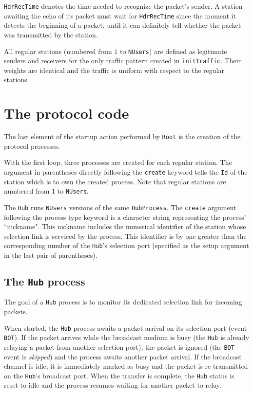 {\tt HdrRecTime} denotes the time needed to recognize the packet's sender.
A station awaiting the echo of its packet must wait for {\tt HdrRecTime}
since the moment it detects the beginning of a packet, until it can definitely
tell whether the packet was transmitted by the station.

All regular stations (numbered from $1$ to {\tt NUsers}) are defined as
legitimate senders and receivers for the only traffic pattern created in
{\tt initTraffic}.
Their weights are identical and the traffic is uniform with respect to the
regular stations.

\section{The protocol code}

The last element of the startup action performed by {\tt Root} is the creation
of the protocol processes.

With the first loop, three processes are created for each regular station.
The argument in parentheses directly following the {\tt create} keyword
tells the {\tt Id} of the station which is to own the created process.
Note that regular stations are numbered from $1$ to {\tt NUsers}.

The {\tt Hub} runs {\tt NUsers} versions of the same {\tt HubProcess}.
The {\tt create} argument following the process type keyword is a character
string representing the process' ``nickname".
This nickname includes the numerical identifier of the station whose selection
link is serviced by the process.
This identifier is by one greater than the corresponding number of the
{\tt Hub}'s selection port (specified as the setup argument in the last pair
of parentheses).

\subsection{The {\tt Hub} process}

The goal of a {\tt Hub} process is to monitor its dedicated selection
link for incoming packets.

When started, the {\tt Hub} process awaits a packet arrival on its
selection port (event {\tt BOT}).
If the packet arrives while the broadcast medium is busy (the {\tt Hub} is
already relaying a packet from another selection port), the packet
is ignored (the {\tt BOT} event is {\em skipped\/}) and the process
awaits another packet arrival.
If the broadcast channel is idle, it is immediately marked as busy and the
packet is re-transmitted on the {\tt Hub}'s broadcast port.
When the transfer is complete, the {\tt Hub} status is reset to idle and the
process resumes waiting for another packet to relay.

